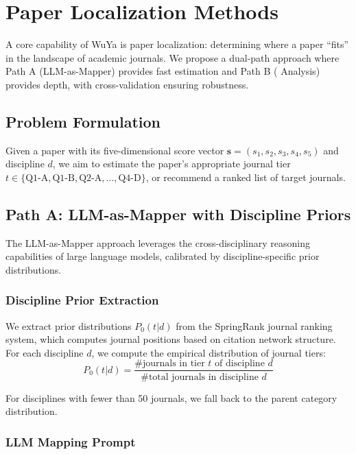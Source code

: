 \section{Paper Localization Methods}
\label{sec:localization}

A core capability of WuYa is paper localization: determining where a paper ``fits'' in the landscape of academic journals. We propose a dual-path approach where Path A (LLM-as-Mapper) provides fast estimation and Path B (\dea{} Analysis) provides depth, with cross-validation ensuring robustness.

\subsection{Problem Formulation}

Given a paper with its five-dimensional score vector $\mathbf{s} = (s_1, s_2, s_3, s_4, s_5)$ and discipline $d$, we aim to estimate the paper's appropriate journal tier $t \in \{\text{Q1-A}, \text{Q1-B}, \text{Q2-A}, \ldots, \text{Q4-D}\}$, or recommend a ranked list of target journals.

\subsection{Path A: LLM-as-Mapper with Discipline Priors}

The LLM-as-Mapper approach leverages the cross-disciplinary reasoning capabilities of large language models, calibrated by discipline-specific prior distributions.

\subsubsection{Discipline Prior Extraction}

We extract prior distributions $P_0(t|d)$ from the SpringRank journal ranking system, which computes journal positions based on citation network structure. For each discipline $d$, we compute the empirical distribution of journal tiers:
\begin{equation}
P_0(t|d) = \frac{\# \text{journals in tier } t \text{ of discipline } d}{\# \text{total journals in discipline } d}
\end{equation}

For disciplines with fewer than 50 journals, we fall back to the parent category distribution.

\subsubsection{LLM Mapping Prompt}


